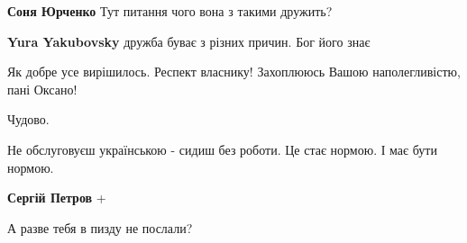 \begin{itemize}
\begin{itemize}
\textbf{Соня Юрченко} Тут питання чого вона з такими дружить?

 
\textbf{Yura Yakubovsky} дружба буває з різних причин. Бог його знає

\end{itemize}

 
Як добре усе вирішилось. Респект власнику!
Захоплююсь Вашою наполегливістю, пані Оксано!

 
Чудово.

 
Не обслуговуєш українською - сидиш без роботи. Це стає нормою. І має бути нормою.

\begin{itemize}
 
\textbf{Сергій Петров} +
\end{itemize}

 
А разве тебя в пизду не послали?


\end{itemize}
